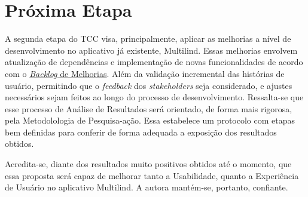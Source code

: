 \section{Próxima Etapa}
\label{sec:Proxima Etapa}
A segunda etapa do TCC visa, principalmente, aplicar as melhorias a nível de desenvolvimento no aplicativo já existente, Multilind. Essas melhorias envolvem atualização de dependências e implementação 
de novas funcionalidades de acordo com o \hyperref[sec:Backlog de Melhorias]{\textit{Backlog} de Melhorias}. Além da validação incremental das histórias de usuário, permitindo que o \textit{feedback} 
dos \textit{stakeholders} seja considerado, e ajustes necessários sejam feitos ao longo do processo de desenvolvimento. Ressalta-se que esse processo de Análise de Resultados será orientado, de forma mais rigorosa, pela Metodolologia de Pesquisa-ação. Essa estabelece um protocolo com etapas bem definidas para conferir de forma adequada a exposição dos resultados obtidos.

Acredita-se, diante dos resultados muito positivos obtidos até o momento, que essa proposta será capaz de melhorar tanto a Usabilidade, quanto a Experiência de Usuário no aplicativo Multilind. 
A autora mantém-se, portanto, confiante.